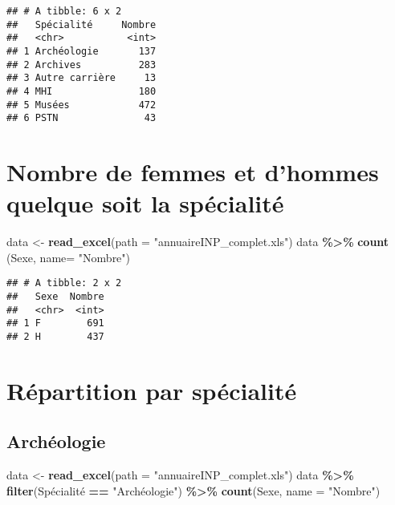 \documentclass[
]{article}
\newenvironment{Shaded}{\begin{snugshade}}{\end{snugshade}}
\newcommand{\DataTypeTok}[1]{\textcolor[rgb]{0.13,0.29,0.53}{#1}}
\newcommand{\KeywordTok}[1]{\textcolor[rgb]{0.13,0.29,0.53}{\textbf{#1}}}
\newcommand{\NormalTok}[1]{#1}
\newcommand{\OperatorTok}[1]{\textcolor[rgb]{0.81,0.36,0.00}{\textbf{#1}}}
\newcommand{\StringTok}[1]{\textcolor[rgb]{0.31,0.60,0.02}{#1}}
\begin{document}
\begin{verbatim}
## # A tibble: 6 x 2
##   Spécialité     Nombre
##   <chr>           <int>
## 1 Archéologie       137
## 2 Archives          283
## 3 Autre carrière     13
## 4 MHI               180
## 5 Musées            472
## 6 PSTN               43
\end{verbatim}

\hypertarget{nombre-de-femmes-et-dhommes-quelque-soit-la-spuxe9cialituxe9}{%
\section{Nombre de femmes et d'hommes quelque soit la
spécialité}\label{nombre-de-femmes-et-dhommes-quelque-soit-la-spuxe9cialituxe9}}

\begin{Shaded}
\begin{Highlighting}[]
\NormalTok{data \textless{}{-}}\StringTok{ }\KeywordTok{read\_excel}\NormalTok{(}\DataTypeTok{path =} \StringTok{"annuaireINP\_complet.xls"}\NormalTok{)}
\NormalTok{data }\OperatorTok{\%\textgreater{}\%}\StringTok{ }
\StringTok{  }\KeywordTok{count}\NormalTok{ (Sexe, }\DataTypeTok{name=} \StringTok{"Nombre"}\NormalTok{)}
\end{Highlighting}
\end{Shaded}

\begin{verbatim}
## # A tibble: 2 x 2
##   Sexe  Nombre
##   <chr>  <int>
## 1 F        691
## 2 H        437
\end{verbatim}

\hypertarget{ruxe9partition-par-spuxe9cialituxe9}{%
\section{Répartition par
spécialité}\label{ruxe9partition-par-spuxe9cialituxe9}}

\hypertarget{archuxe9ologie}{%
\subsection{Archéologie}\label{archuxe9ologie}}

\begin{Shaded}
\begin{Highlighting}[]
\NormalTok{data \textless{}{-}}\StringTok{ }\KeywordTok{read\_excel}\NormalTok{(}\DataTypeTok{path =} \StringTok{"annuaireINP\_complet.xls"}\NormalTok{)}
\NormalTok{data }\OperatorTok{\%\textgreater{}\%}
\StringTok{  }\KeywordTok{filter}\NormalTok{(Spécialité }\OperatorTok{==}\StringTok{ "Archéologie"}\NormalTok{) }\OperatorTok{\%\textgreater{}\%}\StringTok{ }
\StringTok{  }\KeywordTok{count}\NormalTok{(Sexe, }\DataTypeTok{name =} \StringTok{"Nombre"}\NormalTok{)}
\end{Highlighting}
\end{Shaded}
\end{document}
